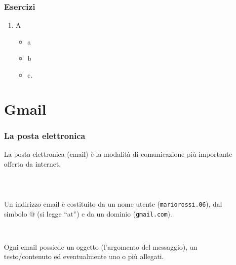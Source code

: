 \documentclass[handout]{beamer}
\begin{document}
\begin{frame}
\frametitle{Esercizi}
\begin{enumerate}
  \item A
  \begin{itemize}
    \item a
    \item b
    \item c.
  \end{itemize}
\end{enumerate}
\end{frame}



\section{Gmail}


\begin{frame}
\frametitle{La posta elettronica}
La posta elettronica (\alert<1>{email}) è la modalità di comunicazione più importante offerta da internet.\pause

~

\begin{columns}
  \begin{column}{0.55\textwidth}
  Un indirizzo email è costituito da un nome utente (\texttt{mariorossi.06}), dal simbolo $@$ (si legge ``at'') e da un dominio (\texttt{gmail.com}).\pause

   ~
   
   Ogni email possiede un \alert<3>{oggetto} (l'argomento del messaggio), un \alert<3>{testo/contenuto} ed eventualmente uno o più \alert<3>{allegati}.
  \end{column}
  \begin{column}{0.37\textwidth}
  \end{column}
\end{columns}
\end{frame}
\end{document}
